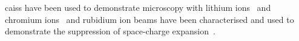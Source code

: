 \Glspl{cais} have been used to demonstrate microscopy with lithium ions~\cite{knuffman_nanoscale_2011} and chromium ions~\cite{steele_focused_2010} and rubidium ion beams have been characterised and used to demonstrate the suppression of space-charge expansion~\cite{murphy_detailed_2014,thompson_suppression_2016}.


